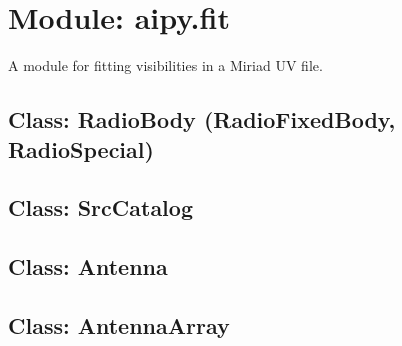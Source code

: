 \section{Module: aipy.fit}

A module for fitting visibilities in a Miriad UV file.

\subsection{Class: RadioBody (RadioFixedBody, RadioSpecial)}

\subsection{Class: SrcCatalog}

\subsection{Class: Antenna}

\subsection{Class: AntennaArray}

